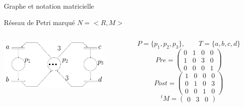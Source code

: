 \documentclass[compress]{beamer}
\begin{document}
\begin{frame}{Graphe et notation matricielle}
\begin{block}{Réseau de Petri marqué $N=<\!R,M\!>$}
\begin{columns}
	\begin{column}{.5\textwidth}
		\includegraphics[width=5.5cm]{lececr}
	\end{column}
	\begin{column}{.6\textwidth}
		$$P=\{p_1,p_2,p_3\}, \qquad T=\{a,b,c,d\}$$
		$$Pre = \begin{pmatrix}
			0 & 1 & 0 & 0 \\
			1 & 0 & 3 & 0 \\
			0 & 0 & 0 & 1 
			\end{pmatrix}$$
		$$Post = \begin{pmatrix}
			1 & 0 & 0 & 0 \\
			0 & 1 & 0 & 3 \\
			0 & 0 & 1 & 0 
			\end{pmatrix}$$
		$${}^tM = \begin{pmatrix}0 & 3 & 0\end{pmatrix}$$
	\end{column}	
\end{columns}
\end{block}
\end{frame}
\end{document}
